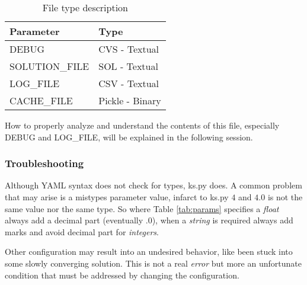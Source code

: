         \begin{table}[ht]
            \centering
            \caption{File type description}
            \begin{tabular}{|l|l|}
                \hline
                Parameter & Type \\
                \hline 
                DEBUG & CVS - Textual\\
                \hline 
                SOLUTION\_FILE & SOL - Textual\\
                \hline 
                LOG\_FILE & CSV - Textual \\
                \hline 
                CACHE\_FILE & Pickle - Binary \\
                \hline
            \end{tabular}
            \label{tab:file_decr1}
        \end{table}

        How to properly analyze and understand the contents of this file, especially DEBUG and LOG\_FILE, will be explained in the following session.


        \subsubsection{Troubleshooting}
        Although YAML syntax does not check for types, ks.py does. A common problem that may arise is a mistypes parameter value, infarct to ks.py $4$ and $4.0$
        is not the same value nor the same type. So where Table \ref{tab:params} specifies a \emph{float} always add a decimal part (eventually $.0$), when a \emph{string} 
        is required always add marks and avoid decimal part for \emph{integers}.

        Other configuration may result into an undesired behavior, like been stuck into some slowly converging solution. This is not a real \emph{error} but more 
        an unfortunate condition that must be addressed by changing the configuration.
